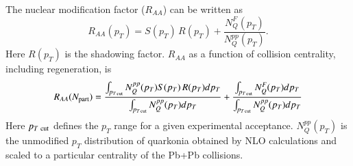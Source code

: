 {\begin{equation}
  \end{equation}
  The nuclear modification factor ($R_{AA}$) can be written as 
  \begin{equation}
    R_{AA}(p_T)=S(p_T) \, R(p_T) + \frac{N_{Q}^F(p_T)}{N_{Q}^{pp}(p_T)}.
    \label{raa}
  \end{equation}
  Here $R(p_T)$ is the shadowing factor.
  $R_{AA}$ as a function of collision centrality, including regeneration, is
  \begin{equation}
    R_{AA}(N_{\rm part}) = \frac{\int_{p_{T\,\rm cut}} N_{Q}^{pp}(p_T)S(p_T)\, R(p_T) dp_T}{\int_{p_{T\,\rm cut}} N_{Q}^{pp}(p_T) dp_T} + 
    \frac{\int_{p_{T\, \rm cut}} N_{Q}^F(p_T) dp_T}{\int_{p_{T\, \rm cut}} N_{Q}^{pp}(p_T) dp_T}
    \label{raa2}
  \end{equation}
  Here $p_{T~{\rm cut}}$ defines the $p_T$ range for a given experimental acceptance.
  $N_{Q}^{pp}(p_T)$ is the unmodified $p_T$ distribution of quarkonia obtained by NLO 
  calculations and scaled to a particular centrality of the Pb+Pb collisions.
  
}
